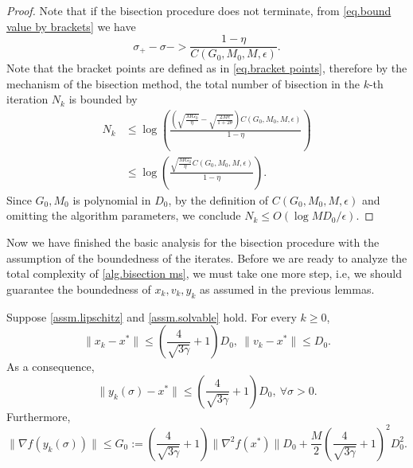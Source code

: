 \documentclass{article}
\begin{document}
\begin{proof}
    Note that if the bisection procedure does not terminate, from \eqref{eq.bound value by brackets} we have
    \begin{equation*}
        \sigma_+-\sigma- > \frac{1-\eta}{ C(G_0,M_0,M,\epsilon)}.
    \end{equation*}
    Note that the bracket points are defined as in \eqref{eq.bracket points}, therefore by the mechanism of the bisection method, the total number of bisection in the $k$-th iteration $N_k$ is bounded by 
    \begin{equation*}
    \begin{aligned}
        N_k &\leq \log \left(\frac{\left(\sqrt{\frac{MG_0}{\eta}}-\sqrt{\frac{2M\epsilon}{1+2\theta}}\right)C(G_0,M_0,M,\epsilon)}{1-\eta}\right)\\
        &\leq \log \left(\frac{\sqrt{\frac{MG_0}{\eta}}C(G_0,M_0,M,\epsilon)}{1-\eta}\right).
    \end{aligned}
    \end{equation*}
    Since $G_0,M_0$ is polynomial in $D_0$, by the definition of $C(G_0,M_0,M,\epsilon)$ and omitting the algorithm parameters, we conclude $N_k \leq O\left(\log MD_0/\epsilon\right)$.
\end{proof}
Now we have finished the basic analysis for the bisection procedure with the assumption of the boundedness of the iterates. Before we are ready to analyze the total complexity of \autoref{alg.bisection ms}, we must take one more step, i.e, we should guarantee the boundedness of $x_k,v_k,y_k$ as assumed in the previous lemmas.
\begin{lemma}
    \label{lem.bounded iterate}
    Suppose \autoref{assm.lipschitz} and \autoref{assm.solvable} hold. For every $k\geq 0$, 
    \begin{equation}
        \label{eq.bounded iterate}
        \|x_k- x^*\| \leq \left(\frac{4}{\sqrt{3\gamma}}+1\right)D_0, \ \|v_k-x^*\|\leq D_0.
    \end{equation}
    As a consequence,
    \begin{equation}
        \label{eq.bounded iterate y}
        \|y_k(\sigma)-x^*\| \leq \left(\frac{4}{\sqrt{3\gamma}}+1\right)D_0, \ \forall \sigma>0.
    \end{equation}
    Furthermore,
    \begin{equation}
        \label{eq.ub yk sigma}
        \|\nabla f(y_k(\sigma))\| \leq G_0:= \left(\frac{4}{\sqrt{3\gamma}}+1\right)\|\nabla ^2 f(x^*)\|D_0+\frac{M}{2}\left(\frac{4}{\sqrt{3\gamma}}+1\right)^2 D_0^2.
    \end{equation}
\end{lemma}
\end{document}
